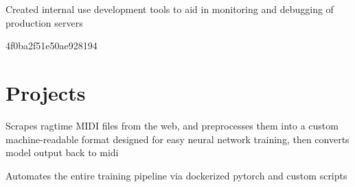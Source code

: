 \documentclass[letterpaper]{deedy-resume} %
\begin{document}
\begin{minipage}[t]{0.66\textwidth}
\sectionspace %


\vspace{1mm} %
\vspace{1mm} %

\begin{tightitemize}
    \item Created internal use development tools to aid in monitoring and 
        debugging of production servers
\end{tightitemize}
4f0ba2f51e50ae928194
\sectionspace %


\section{Projects}


\vspace{1mm} %

\begin{tightitemize}
    \item Scrapes ragtime MIDI files from the web, and preprocesses them into a 
        custom machine-readable format designed for easy neural network 
        training, then converts model output back to midi
    \item Automates the entire training pipeline via dockerized pytorch and 
        custom scripts
\end{tightitemize}
\sectionspace


\end{minipage}
\end{document}
